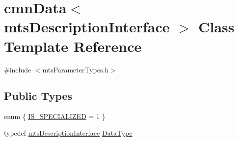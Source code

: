 \hypertarget{classcmn_data_3_01mts_description_interface_01_4}{\section{cmn\-Data$<$ mts\-Description\-Interface $>$ Class Template Reference}
\label{classcmn_data_3_01mts_description_interface_01_4}
}


{\ttfamily \#include $<$mts\-Parameter\-Types.\-h$>$}

\subsection*{Public Types}
\begin{DoxyCompactItemize}
\item 
enum \{ \hyperlink{classcmn_data_3_01mts_description_interface_01_4_aee4356b5ee771ed231d7eb63c8ba6923afe05305fe82655e69f80ecd133751f94}{I\-S\-\_\-\-S\-P\-E\-C\-I\-A\-L\-I\-Z\-E\-D} = 1
 \}
\item 
typedef \hyperlink{classmts_description_interface}{mts\-Description\-Interface} \hyperlink{classcmn_data_3_01mts_description_interface_01_4_a17b736179c710a2ad3b114ef631709bb}{Data\-Type}
\end{DoxyCompactItemize}
